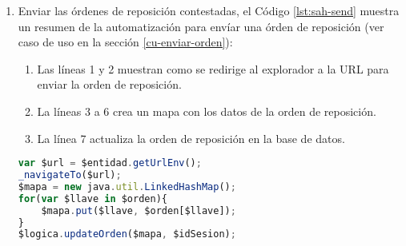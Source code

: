 \begin{enumerate}
	\item Enviar las órdenes de reposición contestadas, el Código \ref{lst:sah-send} muestra un resumen de la automatización para envíar una órden de reposición (ver caso de uso en la sección \ref{cu-enviar-orden}):
	\begin{enumerate}
		\item Las líneas 1 y 2 muestran como se redirige al explorador a la URL para enviar la orden de reposición.
		\item La líneas 3 a 6 crea un mapa con los datos de la orden de reposición.
		\item La línea 7 actualiza la orden de reposición en la base de datos. 
	\end{enumerate}
	\begin{lstlisting}[language=Javascript, caption={Enviar orden de reposición.}, captionpos=b, label={lst:sah-send}]
var $url = $entidad.getUrlEnv();
_navigateTo($url);
$mapa = new java.util.LinkedHashMap();
for(var $llave in $orden){
	$mapa.put($llave, $orden[$llave]);
}
$logica.updateOrden($mapa, $idSesion);
	\end{lstlisting}
\end{enumerate}

